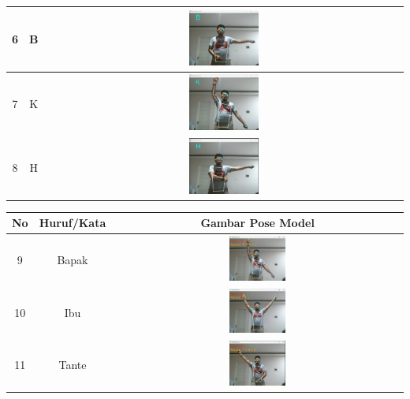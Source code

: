 \begin{table}[!hbt]
\begin{tabular}{|c|c|c|}
	\hline
	6 & B & \includegraphics[width=0.2\textwidth]{gambar/bener/HurufB_ModelCNN2_Dawe.png} \\
	\hline
	7 & K & \includegraphics[width=0.2\textwidth]{gambar/bener/HurufK_ModelCNN2_Dawe.png} \\
	\hline
	8 & H & \includegraphics[width=0.2\textwidth]{gambar/bener/HurufH_ModelCNN2_Dawe.png} \\
	\hline
	\end{tabular}
\end{table}

\begin{table}[!hbt]
	\centering
	\begin{tabular}{|c|c|c|}
		\hline
		No & Huruf/Kata & Gambar Pose Model  \\
		\hline
		9 & Bapak & \includegraphics[width=0.2\textwidth]{gambar/bener/HurufBapak_CNN2_Dawe.png} \\
		\hline
		10 & Ibu & \includegraphics[width=0.2\textwidth]{gambar/bener/HurufIbu_ModelCNN2_Dawe.png} \\
		\hline
		11 & Tante & \includegraphics[width=0.2\textwidth]{gambar/bener/HurufTante_ModelCNN2_Dawe.png} \\
		\hline
	\end{tabular}
\end{table}

